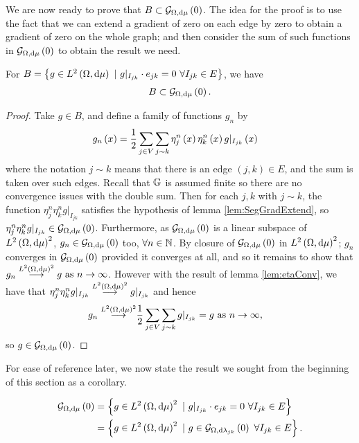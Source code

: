We are now ready to prove that $B\subset\mathcal{G}_{ \Omega, \mathrm{d}\mu}\left( 0 \right)$.
The idea for the proof is to use the fact that we can extend a gradient of zero on each edge by zero to obtain a gradient of zero on the whole graph; and then consider the sum of such functions in $\mathcal{G}_{ \Omega, \mathrm{d}\mu}\left( 0 \right)$ to obtain the result we need.

\begin{prop} \label{prop:BIncGrad0}
	For $B = \clbracs{g\in\ltwo{\ddom}{\ddmes} \ \vert \ g\vert_{I_{jk}}\cdot e_{jk}=0 \ \forall I_{jk}\in E}$, we have
	\begin{align*}
		B \subset \mathcal{G}_{ \Omega, \mathrm{d}\mu}\left( 0 \right).
	\end{align*}
\end{prop}
\begin{proof}
	Take $g\in B$, and define a family of functions $g_n$ by
	\begin{align*}
		g_n\left( x \right) &= \frac{1}{2}\sum_{j\in V}\sum_{j\sim k}\eta_j^n\left( x \right)\eta_k^n\left( x \right)g\vert_{I_{jk}}\left( x \right)
	\end{align*}
	where the notation $j\sim k$ means that there is an edge $(j,k)\in E$, and the sum is taken over such edges. 
	Recall that $\mathbb{G}$ is assumed finite so there are no convergence issues with the double sum.
	Then for each $j,k$ with $j\sim k$, the function $\eta_j^n\eta_k^n g\vert_{I_{jk}}$ satisfies the hypothesis of lemma \ref{lem:SegGradExtend}, so $\eta_j^n\eta_k^n g\vert_{I_{jk}}\in\mathcal{G}_{ \Omega, \mathrm{d}\mu}\left( 0 \right)$.
	Furthermore, as $\mathcal{G}_{ \Omega, \mathrm{d}\mu}\left( 0 \right)$ is a linear subspace of $L^{2}\left( \Omega,\mathrm{d}\mu \right)^{2}$, $g_n\in\mathcal{G}_{ \Omega, \mathrm{d}\mu}\left( 0 \right)$ too, $\forall n\in\mathbb{N}$.
	By closure of $\mathcal{G}_{ \Omega, \mathrm{d}\mu}\left( 0 \right)$ in $L^{2}\left( \Omega,\mathrm{d}\mu \right)^2$; $g_n$ converges in $\mathcal{G}_{ \Omega, \mathrm{d}\mu}\left( 0 \right)$ provided it converges at all, and so it remains to show that $g_n\overset{L^{2}\left( \Omega,\mathrm{d}\mu \right)^2}{\longrightarrow} g \ \text{as} \ n \rightarrow\infty$.
	However with the result of lemma \ref{lem:etaConv}, we have that $\eta_j^n\eta_k^n g\vert_{I_{jk}}\overset{L^{2}\left( \Omega,\mathrm{d}\mu \right)^2}{\longrightarrow} g\vert_{I_{jk}}$ and hence
	\begin{align*}
		g_n \overset{L^{2}\left( \Omega,\mathrm{d}\mu \right)^2}{\longrightarrow} &\frac{1}{2}\sum_{j\in V}\sum_{j\sim k}g\vert_{I_{jk}} = g \ \text{as} \ n \rightarrow\infty,
	\end{align*}
	so $g\in\mathcal{G}_{ \Omega, \mathrm{d}\mu}\left( 0 \right)$.
\end{proof}

For ease of reference later, we now state the result we sought from the beginning of this section as a corollary.
\begin{cory} \label{cory:CharacterisationGradientsZero}
	\begin{align*}
		\gradZero{\ddom}{\ddmes} &= \clbracs{g\in\ltwo{\ddom}{\ddmes}^2 \ \vert \ g\vert_{I_{jk}}\cdot e_{jk}=0 \ \forall I_{jk}\in E} \\
		&= \clbracs{g\in\ltwo{\ddom}{\ddmes}^2 \ \vert \ g\in\gradZero{\ddom}{\lambda_{jk}} \ \forall I_{jk}\in E}.
	\end{align*}
\end{cory}

